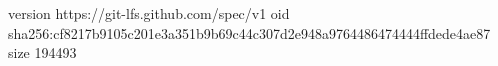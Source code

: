 version https://git-lfs.github.com/spec/v1
oid sha256:cf8217b9105c201e3a351b9b69c44c307d2e948a9764486474444ffdede4ae87
size 194493

